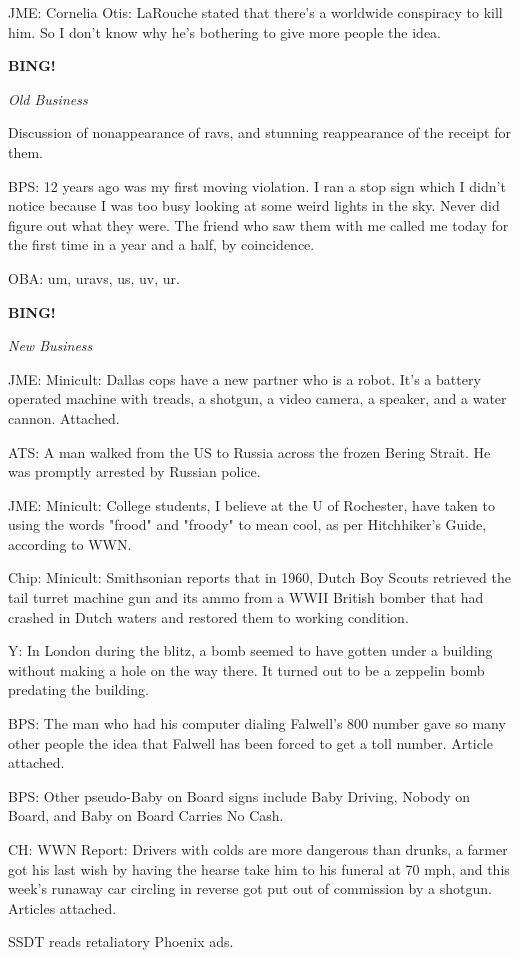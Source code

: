 \documentclass[12pt]{article}
\newcommand{\bing}{{\bf BING!} }
\newcommand{\goto}[1]{\bing \vskip 12pt \centerline{{\em{#1}}}}
\begin{document}
JME: Cornelia Otis: LaRouche stated that there's a worldwide conspiracy to kill him. So I don't know why he's bothering to give more people the idea.

\goto{Old Business}

Discussion of nonappearance of ravs, and stunning reappearance of the receipt for them.

BPS: 12 years ago was my first moving violation. I ran a stop sign which I didn't notice because I was too busy looking at some weird lights in the sky. Never did figure out what they were. The friend who saw them with me called me today for the first time in a year and a half, by coincidence.

OBA: um, uravs, us, uv, ur.

\goto{New Business}

JME: Minicult: Dallas cops have a new partner who is a robot. It's a battery operated machine with treads, a shotgun, a video camera, a speaker, and a water cannon. Attached.

ATS: A man walked from the US to Russia across the frozen Bering Strait. He was promptly arrested by Russian police.

JME: Minicult: College students, I believe at the U of Rochester, have taken to using the words "frood" and "froody" to mean cool, as per Hitchhiker's Guide, according to WWN.

Chip: Minicult: Smithsonian reports that in 1960, Dutch Boy Scouts retrieved the tail turret machine gun and its ammo from a WWII British bomber that had crashed in Dutch waters and restored them to working condition.

Y: In London during the blitz, a bomb seemed to have gotten under a building without making a hole on the way there. It turned out to be a zeppelin bomb predating the building.

BPS: The man who had his computer dialing Falwell's 800 number gave so many other people the idea that Falwell has been forced to get a toll number. Article attached.

BPS: Other pseudo-Baby on Board signs include Baby Driving, Nobody on Board, and Baby on Board Carries No Cash.

CH: WWN Report: Drivers with colds are more dangerous than drunks, a farmer got his last wish by having the hearse take him to his funeral at 70 mph, and this week's runaway car circling in reverse got put out of commission by a shotgun. Articles attached.

SSDT reads retaliatory Phoenix ads.
\end{document}
